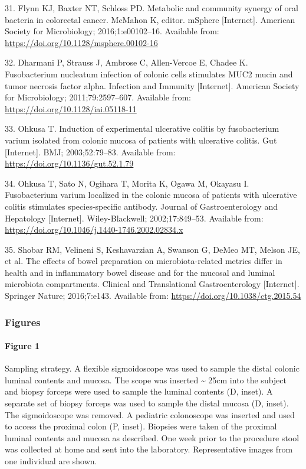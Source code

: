 \documentclass[12pt,]{article}
\let\oldparagraph\paragraph
\renewcommand{\paragraph}[1]{\oldparagraph{#1}\mbox{}}
\begin{document}
\hypertarget{ref-Flynn2016}{}
31. Flynn KJ, Baxter NT, Schloss PD. Metabolic and community synergy of
oral bacteria in colorectal cancer. McMahon K, editor. mSphere
{[}Internet{]}. American Society for Microbiology; 2016;1:e00102--16.
Available from: \url{https://doi.org/10.1128/msphere.00102-16}

\hypertarget{ref-Dharmani2011}{}
32. Dharmani P, Strauss J, Ambrose C, Allen-Vercoe E, Chadee K.
Fusobacterium nucleatum infection of colonic cells stimulates MUC2 mucin
and tumor necrosis factor alpha. Infection and Immunity {[}Internet{]}.
American Society for Microbiology; 2011;79:2597--607. Available from:
\url{https://doi.org/10.1128/iai.05118-11}

\hypertarget{ref-Ohkusa2003}{}
33. Ohkusa T. Induction of experimental ulcerative colitis by
fusobacterium varium isolated from colonic mucosa of patients with
ulcerative colitis. Gut {[}Internet{]}. BMJ; 2003;52:79--83. Available
from: \url{https://doi.org/10.1136/gut.52.1.79}

\hypertarget{ref-Ohkusa2002}{}
34. Ohkusa T, Sato N, Ogihara T, Morita K, Ogawa M, Okayasu I.
Fusobacterium varium localized in the colonic mucosa of patients with
ulcerative colitis stimulates species-specific antibody. Journal of
Gastroenterology and Hepatology {[}Internet{]}. Wiley-Blackwell;
2002;17:849--53. Available from:
\url{https://doi.org/10.1046/j.1440-1746.2002.02834.x}

\hypertarget{ref-Shobar2016}{}
35. Shobar RM, Velineni S, Keshavarzian A, Swanson G, DeMeo MT, Melson
JE, et al. The effects of bowel preparation on microbiota-related
metrics differ in health and in inflammatory bowel disease and for the
mucosal and luminal microbiota compartments. Clinical and Translational
Gastroenterology {[}Internet{]}. Springer Nature; 2016;7:e143. Available
from: \url{https://doi.org/10.1038/ctg.2015.54}

\newpage

\subsubsection{Figures}\label{figures}

\paragraph{Figure 1}\label{figure-1}

Sampling strategy. A flexible sigmoidoscope was used to sample the
distal colonic luminal contents and mucosa. The scope was inserted
\textasciitilde{} 25cm into the subject and biopsy forceps were used to
sample the luminal contents (D, inset). A separate set of biopsy forceps
was used to sample the distal mucosa (D, inset). The sigmoidoscope was
removed. A pediatric colonoscope was inserted and used to access the
proximal colon (P, inset). Biopsies were taken of the proximal luminal
contents and mucosa as described. One week prior to the procedure stool
was collected at home and sent into the laboratory. Representative
images from one individual are shown.
\end{document}
